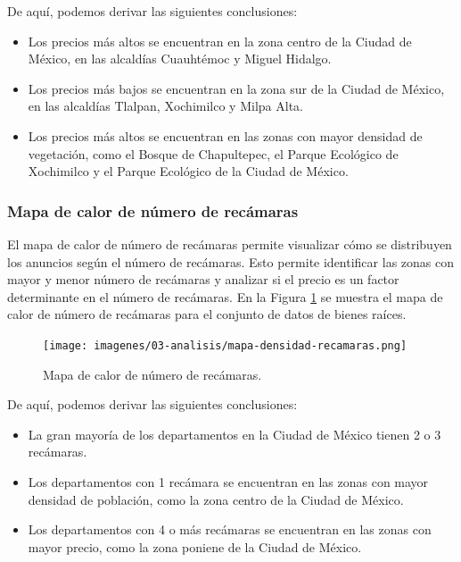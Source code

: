 De aquí, podemos derivar las siguientes conclusiones:

\begin{itemize}
  \item Los precios más altos se encuentran en la zona centro de la Ciudad de
  México, en las alcaldías Cuauhtémoc y Miguel Hidalgo.
  \item Los precios más bajos se encuentran en la zona sur de la Ciudad de
  México, en las alcaldías Tlalpan, Xochimilco y Milpa Alta.
\item Los precios más altos se encuentran en las zonas con mayor densidad de
  vegetación, como el Bosque de Chapultepec, el Parque Ecológico de Xochimilco
  y el Parque Ecológico de la Ciudad de México.
\end{itemize}

\subsubsection{Mapa de calor de número de recámaras}

El mapa de calor de número de recámaras permite visualizar cómo se distribuyen
los anuncios según el número de recámaras. Esto permite identificar las zonas
con mayor y menor número de recámaras y analizar si el precio es un factor
determinante en el número de recámaras. En la Figura \ref{fig:mapa_calor_recamaras}
se muestra el mapa de calor de número de recámaras para el conjunto de datos de
bienes raíces.

\begin{figure}[H]
  \centering
  \texttt{[image: imagenes/03-analisis/mapa-densidad-recamaras.png]}
  \caption{Mapa de calor de número de recámaras.}
  \label{fig:mapa_calor_recamaras}
\end{figure}

De aquí, podemos derivar las siguientes conclusiones:

\begin{itemize}
  \item La gran mayoría de los departamentos en la Ciudad de México tienen 2 o
  3 recámaras.
  \item Los departamentos con 1 recámara se encuentran en las zonas con mayor
  densidad de población, como la zona centro de la Ciudad de México.
  \item Los departamentos con 4 o más recámaras se encuentran en las zonas con
  mayor precio, como la zona poniene de la Ciudad de México.
\end{itemize}

